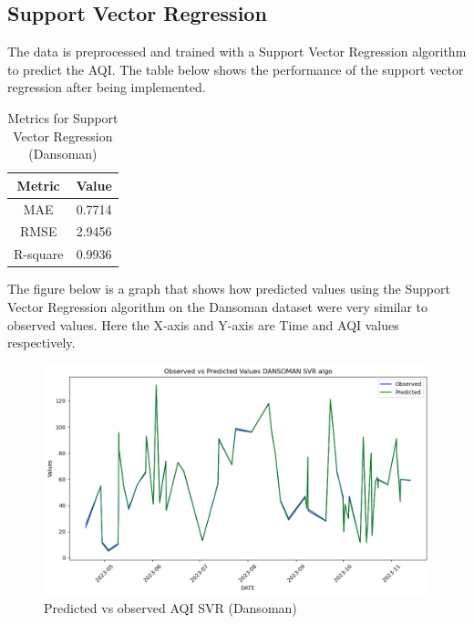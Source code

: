 \documentclass{book}
\numberwithin{equation}{section}
\numberwithin{figure}{section}
\begin{document}
\subsection{Support Vector Regression}
The data is preprocessed and trained with a Support Vector Regression algorithm to predict the AQI. The table below shows the performance of the support vector regression after being implemented.
\begin{table}[H]
    \centering
    \begin{tabular}{|c|c|}
        \hline
        \textbf{Metric} & \textbf{Value} \\
        \hline
        MAE & 0.7714 \\
        \hline
        RMSE & 2.9456\\
        \hline
        R-square & 0.9936 \\
        \hline
    \end{tabular}
    \caption{ Metrics for Support Vector Regression (Dansoman)}
    \label{tab:SVR metrics(Dansoman)}
\end{table}
The figure below is a graph that shows how predicted values using the Support Vector Regression algorithm on the Dansoman dataset were very similar to observed values. Here the X-axis and Y-axis are Time and AQI values respectively.
\begin{figure}[H]
 \centering
        \includegraphics[width=\linewidth]{SVR line graph.png}
        \caption{ Predicted vs observed AQI SVR (Dansoman)}
        \label{fig: SVR predicted vs observed AQI(Dansoman)}
\end{figure}
\end{document}
